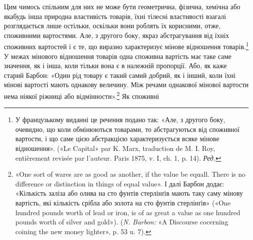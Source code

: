 Цим чимось спільним для них не може бути геометрична, фізична,
хемічна або якабудь інша природна властивість товарів,
їхні тілесні властивості взагалі розглядається лише остільки,
оскільки вони роблять їх корисними, отже, споживними вартостями.
Але, з другого боку, якраз абстрагування від їхніх споживних
вартостей і є те, що виразно характеризує мінове відношення
товарів.\footnote*{
У французькому виданні це речення подано так: «Але, з другого
боку, очевидно, що коли обмінюються товарами, то абстрагуються від
споживної вартости, і що саме цією абстракцією характеризується всяке
мінове відношення». («Le Capital» par K. Marx, traduction de M. I. Roy,
entièrement revisée par l’auteur. Paris 1875, v. I, ch. 1, p. 14). \emph{Ред.}
} У межах мінового відношення товарів одна споживна
вартість має таке саме значення, як і інша, коли тільки
вона є в належній пропорції. Або, як каже старий Барбон: «Один
рід товару є такий самий добрий, як і інший, коли їхні мінові
вартості мають однакову величину. Між речами однакової мінової
вартости нема ніякої ріжниці або відмінности».\footnote{
«One sort of wares are as good as another, if the value be equall.
There is no difference or distinction in things of equal value». І далі Барбон
додає: «Кількість заліза або олива на сто фунтів стерлінґів мають таку
саму мінову вартість, які кількість срібла або золота на сто фунтів стерлінґів»
(«One hundred pounds worth of lead or iron, is of as great a value
as one hundred pounds worth of silver and gold»). (\emph{N. Barbon:}  «A
Discourse cocerning coining the new money lighter», p. 53 u. 7).
} Як споживні
\parbreak{}  %

